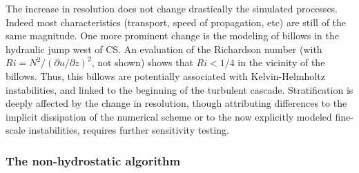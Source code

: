 \documentclass[a4paper,12pt]{article}
\begin{document}
The increase in resolution does not change drastically the simulated processes. Indeed most characteristics (transport, speed of propagation, etc) are still of the same magnitude. One more prominent change is the modeling of billows in the hydraulic jump west of CS. An evaluation of the Richardson number (with $Ri =  N^2 / \left({\partial u}/{\partial z}\right)^2$, not shown) shows that $Ri < 1/4$ in the vicinity of the billows. Thus, this billows are potentially associated with Kelvin-Helmholtz instabilities, and linked to the beginning of the turbulent cascade. 
Stratification is deeply affected by the change in resolution, though attributing differences to the implicit dissipation of the numerical scheme or to the now explicitly modeled fine-scale instabilities, requires further sensitivity testing.
 
\subsubsection{The non-hydrostatic algorithm}
\end{document}
